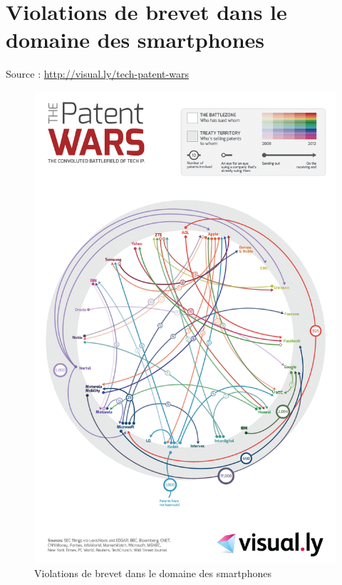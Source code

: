 \chapter{Violations de brevet dans le domaine des smartphones}

Source : \url{http://visual.ly/tech-patent-wars}

\newpage

\begin{figure}[H]
\center
\includegraphics[scale=.442]{images/patent-wars.png}
\caption{Violations de brevet dans le domaine des smartphones}
\end{figure}
